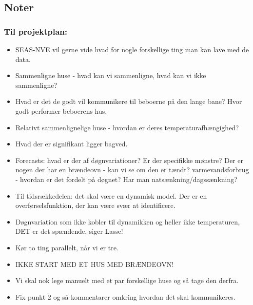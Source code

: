 \subsection{Noter}
\subsubsection{Til projektplan:}
\begin{itemize}
    \item SEAS-NVE vil gerne vide hvad for nogle forskellige ting man kan lave med de data. 
    \item Sammenligne huse - hvad kan vi sammenligne, hvad kan vi ikke sammenligne? 
    \item Hvad er det de godt vil kommunikere til beboerne på den lange bane? Hvor godt performer beboerens hus. 
    \item Relativt sammenlignelige huse - hvordan er deres temperaturafhængighed? 
    \item Hvad der er signifikant ligger bagved.
    \item Forecasts: hvad er der af døgnvariationer? Er der specifikke mønstre? Der er nogen der har en brændeovn - kan vi se om den er tændt? varmevandsforbrug - hvordan er det fordelt på døgnet? Har man natsænkning/dagssænkning? 
    \item Til tidsrækkedelen: det skal være en dynamisk model. Der er en overførselsfunktion, der kan være svær at identificere. 
    \item Døgnvariation som ikke kobler til dynamikken og heller ikke temperaturen, DET er det spændende, siger Lasse!
    \item Kør to ting parallelt, når vi er tre. 
    \item IKKE START MED ET HUS MED BRÆNDEOVN!
    \item Vi skal nok lege manuelt med et par forskellige huse og så tage den derfra. 
    \item Fix punkt 2 og så kommentarer omkring hvordan det skal kommunikeres.
\end{itemize}

